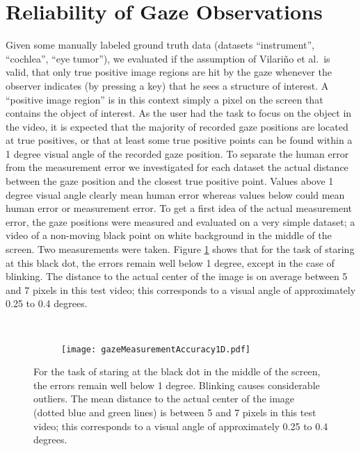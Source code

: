 \section{Reliability of Gaze Observations}
Given some manually labeled ground truth data (datasets ``instrument'', ``cochlea'', ``eye tumor''), we evaluated if the assumption of Vilari\~no et al.\ is valid, that only true positive image regions are hit by the gaze whenever the observer indicates (by pressing a key) that he sees a structure of interest. A ``positive image region'' is in this context simply a pixel on the screen that contains the object of interest.
As the user had the task to focus on the object in the video, it is expected that the majority of recorded gaze positions are located at true positives, or that at least some true positive points can be found within a 1 degree visual angle of the recorded gaze position. 
To separate the human error from the measurement error we investigated for each dataset the actual distance between the gaze position and the closest true positive point. 
Values above 1 degree visual angle clearly mean human error whereas values below could mean human error or measurement error. 
To get a first idea of the actual measurement error, the gaze positions were measured and evaluated on a very simple dataset; a video of a non-moving black point on white background in the middle of the screen. 
Two measurements were taken. Figure \ref{fig:gazeMeasurementAccuracy} shows that for the task of staring at this black dot, the errors remain well below 1 degree, except in the case of blinking. 
The distance to the actual center of the image is on average between 5 and 7 pixels in this test video; this corresponds to a visual angle of approximately 0.25 to 0.4 degrees.

\begin{figure}[ht]
	\centering
	\begin{subfigure}[h]{0.41\textwidth}
	      \setlength{\fboxsep}{0pt}%
	      \setlength{\fboxrule}{0.5pt}%
	      \centering
	\end{subfigure}
	~
	\begin{subfigure}[h]{0.48\textwidth}
		\texttt{[image: gazeMeasurementAccuracy1D.pdf]}	
	\end{subfigure}
	\caption{For the task of staring at the black dot in the middle of the screen, the errors remain well below 1 degree. Blinking causes considerable outliers. The mean distance to the actual center of the image (dotted blue and green lines) is between 5 and 7 pixels in this test video; this corresponds to a visual angle of approximately 0.25 to 0.4 degrees.}
	\label{fig:gazeMeasurementAccuracy}
\end{figure}


